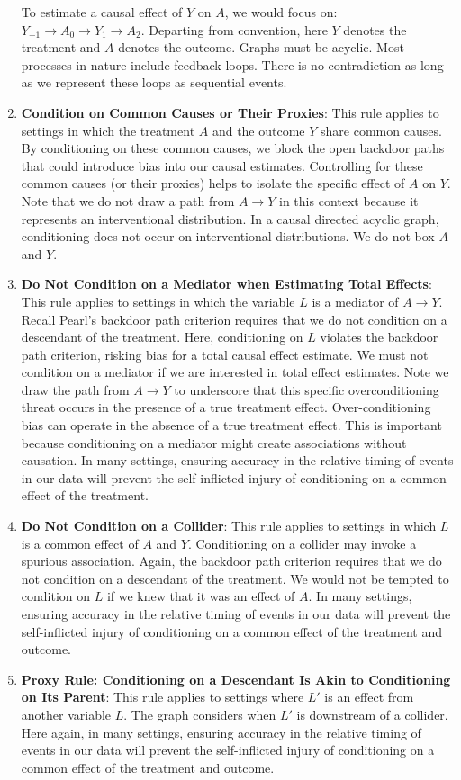 \documentclass[
  single column]{article}
\begin{document}
\begin{enumerate}
  To estimate a causal effect of \(Y\) on \(A\), we would focus on:
  \(\boxed{Y_{-1}} \to \boxed{A_0} \to Y_1 \rightarrow A_2\). Departing
  from convention, here \(Y\) denotes the treatment and \(A\) denotes
  the outcome. Graphs must be acyclic. Most processes in nature include
  feedback loops. There is no contradiction as long as we represent
  these loops as sequential events.
\item
  \textbf{Condition on Common Causes or Their Proxies}: This rule
  applies to settings in which the treatment \(A\) and the outcome \(Y\)
  share common causes. By conditioning on these common causes, we block
  the open backdoor paths that could introduce bias into our causal
  estimates. Controlling for these common causes (or their proxies)
  helps to isolate the specific effect of \(A\) on \(Y\). Note that we
  do not draw a path from \(A \to Y\) in this context because it
  represents an interventional distribution. In a causal directed
  acyclic graph, conditioning does not occur on interventional
  distributions. We do not box \(A\) and \(Y\).
\item
  \textbf{Do Not Condition on a Mediator when Estimating Total Effects}:
  This rule applies to settings in which the variable \(L\) is a
  mediator of \(A \to Y\). Recall Pearl's backdoor path criterion
  requires that we do not condition on a descendant of the treatment.
  Here, conditioning on \(L\) violates the backdoor path criterion,
  risking bias for a total causal effect estimate. We must not condition
  on a mediator if we are interested in total effect estimates. Note we
  draw the path from \(A \to Y\) to underscore that this specific
  overconditioning threat occurs in the presence of a true treatment
  effect. Over-conditioning bias can operate in the absence of a true
  treatment effect. This is important because conditioning on a mediator
  might create associations without causation. In many settings,
  ensuring accuracy in the relative timing of events in our data will
  prevent the self-inflicted injury of conditioning on a common effect
  of the treatment.
\item
  \textbf{Do Not Condition on a Collider}: This rule applies to settings
  in which \(L\) is a common effect of \(A\) and \(Y\). Conditioning on
  a collider may invoke a spurious association. Again, the backdoor path
  criterion requires that we do not condition on a descendant of the
  treatment. We would not be tempted to condition on \(L\) if we knew
  that it was an effect of \(A\). In many settings, ensuring accuracy in
  the relative timing of events in our data will prevent the
  self-inflicted injury of conditioning on a common effect of the
  treatment and outcome.
\item
  \textbf{Proxy Rule: Conditioning on a Descendant Is Akin to
  Conditioning on Its Parent}: This rule applies to settings where
  \(L'\) is an effect from another variable \(L\). The graph considers
  when \(L'\) is downstream of a collider. Here again, in many settings,
  ensuring accuracy in the relative timing of events in our data will
  prevent the self-inflicted injury of conditioning on a common effect
  of the treatment and outcome.
\end{enumerate}
\end{document}

